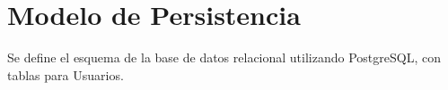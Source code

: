 \section{Modelo de Persistencia}
Se define el esquema de la base de datos relacional utilizando PostgreSQL, con tablas para Usuarios.